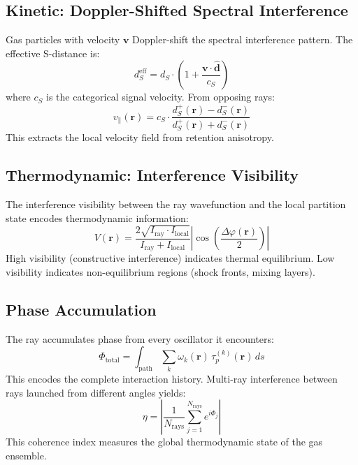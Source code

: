 \documentclass[twocolumn,10pt,a4paper]{article}
\theoremstyle{plain}
\theoremstyle{definition}
\theoremstyle{remark}
\newcommand{\taup}{\tau_p}
\begin{document}
\subsection{Kinetic: Doppler-Shifted Spectral Interference}

Gas particles with velocity $\mathbf{v}$ Doppler-shift the spectral interference pattern. The effective S-distance is:
\begin{equation}
    d_S^{\mathrm{eff}} = d_S \cdot \left(1 + \frac{\mathbf{v} \cdot \hat{\mathbf{d}}}{c_S}\right)
\end{equation}
where $c_S$ is the categorical signal velocity. From opposing rays:
\begin{equation}
    v_{\parallel}(\mathbf{r}) = c_S \cdot \frac{d_S^+({\mathbf{r}}) - d_S^-(\mathbf{r})}{d_S^+(\mathbf{r}) + d_S^-(\mathbf{r})}
\end{equation}
This extracts the local velocity field from retention anisotropy.

\subsection{Thermodynamic: Interference Visibility}

The interference visibility between the ray wavefunction and the local partition state encodes thermodynamic information:
\begin{equation}
    V(\mathbf{r}) = \frac{2\sqrt{I_{\mathrm{ray}} \cdot I_{\mathrm{local}}}}{I_{\mathrm{ray}} + I_{\mathrm{local}}} \left|\cos\!\left(\frac{\Delta\varphi(\mathbf{r})}{2}\right)\right|
\end{equation}
High visibility (constructive interference) indicates thermal equilibrium. Low visibility indicates non-equilibrium regions (shock fronts, mixing layers).

\subsection{Phase Accumulation}

The ray accumulates phase from every oscillator it encounters:
\begin{equation}
    \Phi_{\mathrm{total}} = \int_{\mathrm{path}} \sum_k \omega_k(\mathbf{r})\, \taup^{(k)}(\mathbf{r})\, ds
\end{equation}
This encodes the complete interaction history. Multi-ray interference between rays launched from different angles yields:
\begin{equation}
    \eta = \left|\frac{1}{N_{\mathrm{rays}}} \sum_{j=1}^{N_{\mathrm{rays}}} e^{i\Phi_j}\right|
\end{equation}
This coherence index measures the global thermodynamic state of the gas ensemble.
\end{document}

